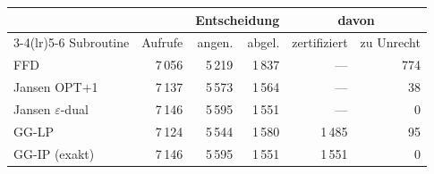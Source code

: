 \begin{tabular}{lrrrrr}
\toprule
& & \multicolumn{2}{c}{Entscheidung} & \multicolumn{2}{c}{davon} \\
\cmidrule(lr){3-4}\cmidrule(lr){5-6}
Subroutine & Aufrufe & angen. & abgel. & zertifiziert & zu Unrecht \\
\midrule
FFD & 7\,056 & 5\,219 & 1\,837 & --- & 774 \\
Jansen OPT+1 & 7\,137 & 5\,573 & 1\,564 & --- & 38 \\
Jansen $\varepsilon$-dual & 7\,146 & 5\,595 & 1\,551 & --- & 0 \\
GG-LP & 7\,124 & 5\,544 & 1\,580 & 1\,485 & 95 \\
GG-IP (exakt) & 7\,146 & 5\,595 & 1\,551 & 1\,551 & 0 \\
\bottomrule
\end{tabular}
